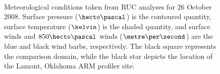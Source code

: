 \begin{figure}[H]
     \begin{center}
%
        \\ %
%
    \end{center}
    \caption{%
        Meteorological conditions taken from RUC analyses for 26 October 2008. Surface pressure ($\hecto\pascal$) is the contoured quantity, surface temperature ($\kelvin$) is the shaded quantity, and surface winds and $850\hecto\pascal$ winds ($\metre\per\second$) are the blue and black wind barbs, respectively. The black square represents the comparison domain, while the black star depicts the location of the Lamont, Oklahoma ARM profiler site.}%
   \label{figure418}
\end{figure}


